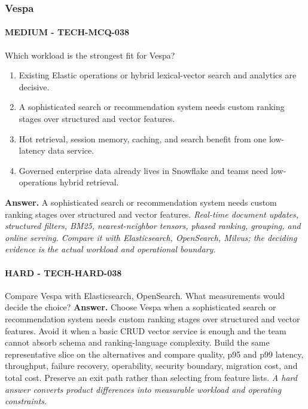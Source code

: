 \subsubsection*{Vespa}
\paragraph{MEDIUM - TECH-MCQ-038} Which workload is the strongest fit for Vespa?
\begin{enumerate}[label=\Alph*.]
\item Existing Elastic operations or hybrid lexical-vector search and analytics are decisive.
\item A sophisticated search or recommendation system needs custom ranking stages over structured and vector features.
\item Hot retrieval, session memory, caching, and search benefit from one low-latency data service.
\item Governed enterprise data already lives in Snowflake and teams need low-operations hybrid retrieval.
\end{enumerate}
\textbf{Answer.} A sophisticated search or recommendation system needs custom ranking stages over structured and vector features.
\textit{Real-time document updates, structured filters, BM25, nearest-neighbor tensors, phased ranking, grouping, and online serving. Compare it with Elasticsearch, OpenSearch, Milvus; the deciding evidence is the actual workload and operational boundary.}
\paragraph{HARD - TECH-HARD-038} Compare Vespa with Elasticsearch, OpenSearch. What measurements would decide the choice?
\textbf{Answer.} Choose Vespa when a sophisticated search or recommendation system needs custom ranking stages over structured and vector features. Avoid it when a basic CRUD vector service is enough and the team cannot absorb schema and ranking-language complexity. Build the same representative slice on the alternatives and compare quality, p95 and p99 latency, throughput, failure recovery, operability, security boundary, migration cost, and total cost. Preserve an exit path rather than selecting from feature lists.
\textit{A hard answer converts product differences into measurable workload and operating constraints.}
